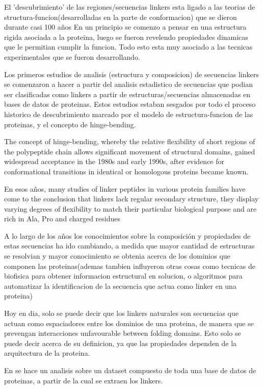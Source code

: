 El 'descubrimiento' de las regiones/secuencias linkers esta ligado a las teorias de structura-funcion(desarrolladas en la parte de conformacion) que se dieron durante casi 100 años
En un principio se comenzo a pensar en una estructura rigida asociada a la proteina, luego se fueron revelendo propiedades dinamicas que le permitian cumplir la funcion. 
Todo esto esta muy asociado a las tecnicas experimentales que se fueron desarrollando.

Los primeros estudios de analisis (estructura y composicion) de secuencias linkers se comenzaron a hacer a partir del analisis estadistico de secuencias que podian ser clasificadas como linkers a partir de estructuras/secuencias almacenadas en bases de datos de proteinas.
Estos estudios estaban sesgados por todo el proceso historico de descubrimiento marcado por el modelo de estructura-funcion de las proteinas, y el concepto de hinge-bending.

The concept of hinge-bending, whereby the relative flexibility of short regions of the polypeptide chain allows significant movement of structural domains, gained widespread acceptance in
the 1980s and early 1990s, after evidence for conformational transitions in identical or homologous proteins became known.


En esos años, many studies of linker peptides in various protein families have come to the conclusion that linkers lack regular secondary structure, they display varying degrees of flexibility to match their particular biological purpose and are rich in Ala, Pro and charged residues

A lo largo de los años los conocimientos sobre la composición y propiedades de estas secuencias ha ido cambiando, 
a medida que mayor cantidad de estructuras se resolvian y mayor conocimiento se obtenia acerca de los dominios que componen las proteinas(ademas tambien influyeron otras cosas como tecnicas de biofisica para obtener informacion estructural en solucion, o algoritmos para automatizar la identificacion de la secuencia que actua como linker en una proteina)

Hoy en dia, solo se puede decir que los linkers naturales son secuencias que actuan como espaciadores entre los dominios de una proteina, de manera que se prevengan interacciones unfavourable between folding domains. 
Esto solo se puede decir acerca de su definicion, ya que las propiedades dependen de la arquitectura de la proteina.

En \cite{george2002analysis} se hace un analisis sobre un dataset compuesto de toda una base de datos de proteinas, a partir de la cual se extraen los linkers.


